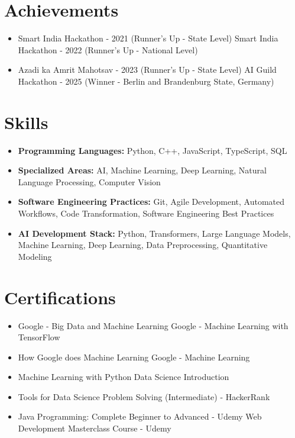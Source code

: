 \documentclass[a4paper,10pt]{article}
\begin{document}
\section*{Achievements}
\begin{itemize}
\item Smart India Hackathon - 2021 (Runner's Up - State Level) \hfill Smart India Hackathon - 2022 (Runner's Up - National Level)
\item Azadi ka Amrit Mahotsav - 2023 (Runner's Up - State Level) \hfill AI Guild Hackathon - 2025 (Winner - Berlin and Brandenburg State, Germany)
\end{itemize}

\section*{Skills}
\begin{itemize}
  \item \textbf{Programming Languages:} Python, C++, JavaScript, TypeScript, SQL
  \item \textbf{Specialized Areas:} AI, Machine Learning, Deep Learning, Natural Language Processing, Computer Vision
  \item \textbf{Software Engineering Practices:} Git, Agile Development, Automated Workflows, Code Transformation, Software Engineering Best Practices
  \item \textbf{AI Development Stack:} Python, Transformers, Large Language Models, Machine Learning, Deep Learning, Data Preprocessing, Quantitative Modeling
\end{itemize}

\section*{Certifications}
\begin{itemize}
\item Google - Big Data and Machine Learning \hfill Google - Machine Learning with TensorFlow
\item How Google does Machine Learning \hfill Google - Machine Learning
\item Machine Learning with Python \hfill Data Science Introduction
\item Tools for Data Science \hfill Problem Solving (Intermediate) - HackerRank
\item Java Programming: Complete Beginner to Advanced - Udemy \hfill Web Development Masterclass Course - Udemy
\end{itemize}
\end{document}
